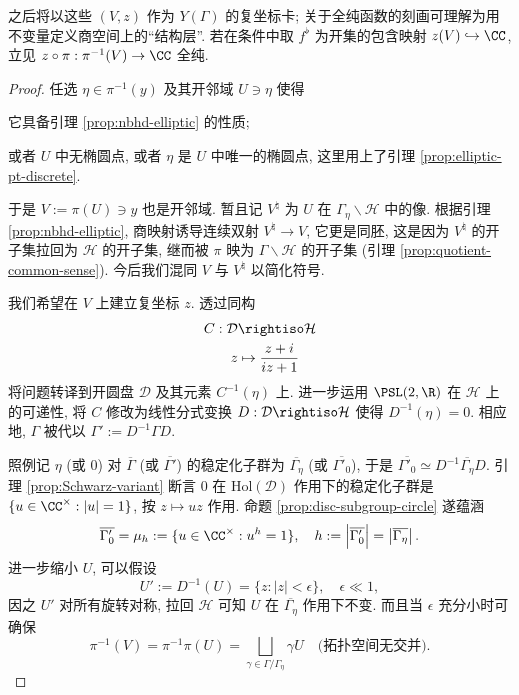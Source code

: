 之后将以这些 $(V, z)$ 作为 $Y(\Gamma)$ 的复坐标卡; 关于全纯函数的刻画可理解为用不变量定义商空间上的``结构层''. 若在条件中取 $f^\flat$ 为开集的包含映射 $z(V) \hookrightarrow \CC$, 立见 $z \circ \pi: \pi^{-1}(V) \to \CC$ 全纯.

\begin{proof}
	任选 $\eta \in \pi^{-1}(y)$ 及其开邻域 $U \ni \eta$ 使得
	\begin{compactitem}
		\item 它具备引理 \ref{prop:nbhd-elliptic} 的性质;
		\item 或者 $U$ 中无椭圆点, 或者 $\eta$ 是 $U$ 中唯一的椭圆点, 这里用上了引理 \ref{prop:elliptic-pt-discrete}.
	\end{compactitem}
	于是 $V := \pi(U) \ni y$ 也是开邻域. 暂且记 $V^\natural$ 为 $U$ 在 $\Gamma_\eta \backslash \mathcal{H}$ 中的像. 根据引理 \ref{prop:nbhd-elliptic}, 商映射诱导连续双射 $V^\natural \to V$, 它更是同胚, 这是因为 $V^\natural$ 的开子集拉回为 $\mathcal{H}$ 的开子集, 继而被 $\pi$ 映为 $\Gamma \backslash \mathcal{H}$ 的开子集 (引理 \ref{prop:quotient-common-sense}). 今后我们混同 $V$ 与 $V^\natural$ 以简化符号.
	
	我们希望在 $V$ 上建立复坐标 $z$. 透过同构
	\begin{align*}
		C: \mathcal{D} & \rightiso \mathcal{H} \\
		z & \mapsto \dfrac{z+i}{iz+1}
	\end{align*}
	将问题转译到开圆盘 $\mathcal{D}$ 及其元素 $C^{-1}(\eta)$ 上. 进一步运用 $\PSL(2,\R)$ 在 $\mathcal{H}$ 上的可递性, 将 $C$ 修改为线性分式变换 $D: \mathcal{D} \rightiso \mathcal{H}$ 使得 $D^{-1}(\eta) = 0$. 相应地, $\Gamma$ 被代以 $\Gamma' := D^{-1}\Gamma D$.
	
	照例记 $\eta$ (或 $0$) 对 $\overline{\Gamma}$ (或 $\overline{\Gamma'}$) 的稳定化子群为 $\overline{\Gamma_\eta}$ (或 $\overline{\Gamma'_0}$), 于是 $\overline{\Gamma'_0} \simeq D^{-1} \overline{\Gamma_\eta} D$. 引理 \ref{prop:Schwarz-variant} 断言 $0$ 在 $\mathrm{Hol}(\mathcal{D})$ 作用下的稳定化子群是 $\{u \in \CC^\times: |u|=1 \}$, 按 $z \mapsto uz$ 作用. 命题 \ref{prop:disc-subgroup-circle} 遂蕴涵
	\begin{equation}\label{eqn:chart-h}
		\overline{\Gamma'_0} = \mu_h := \{u \in \CC^\times: u^h=1 \}, \quad h := \left| \overline{\Gamma'_0} \right| =  \left| \overline{\Gamma_\eta} \right|.
	\end{equation}
	进一步缩小 $U$, 可以假设
	\begin{equation*}
		U' := D^{-1}(U) = \{z : |z| < \epsilon \}, \quad \epsilon \ll 1,
	\end{equation*}
	因之 $U'$ 对所有旋转对称, 拉回 $\mathcal{H}$ 可知 $U$ 在 $\overline{\Gamma_\eta}$ 作用下不变. 而且当 $\epsilon$ 充分小时可确保
	\[ \pi^{-1}(V) = \pi^{-1} \pi(U) = \bigsqcup_{\gamma \in  \Gamma/\Gamma_{\eta}} \gamma U \quad \text{(拓扑空间无交并)}. \]
	

\end{proof}
